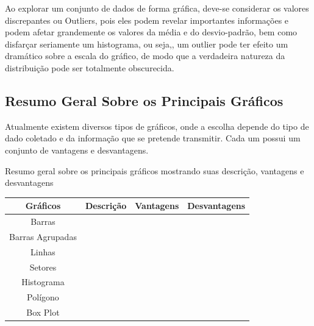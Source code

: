 \inic Ao explorar um conjunto de dados de forma gráfica, deve-se considerar os valores discrepantes ou Outliers, pois eles podem revelar importantes informações e podem afetar grandemente os valores da média e do desvio-padrão, bem como disfarçar seriamente um histograma, ou seja,, um outlier pode ter efeito um dramático sobre a escala do gráfico, de modo que a verdadeira natureza da distribuição pode ser totalmente  obscurecida.












\newpage


\subsection{Resumo Geral Sobre os Principais Gráficos}

\inic Atualmente existem diversos tipos de gráficos, onde a escolha depende do tipo de dado coletado e da informação que se pretende transmitir. Cada um possui um conjunto de vantagens e desvantagens.      

\begin{quadro}[h!tp]
    \centering
    \caption{Resumo geral sobre os principais gráficos mostrando suas descrição, vantagens e desvantagens}
    \begin{tabular}{|c|c|c|c|}
   \hline\hline
    Gráficos       & Descrição &  Vantagens & Desvantagens \\   
\hline\hline
  Barras           &           &           &             \\
  Barras Agrupadas &           &           &              \\
  Linhas           &           &           &              \\  
  Setores          &           &           &              \\
  Histograma       &           &           &              \\
  Polígono         &           &           &              \\
  Box Plot         &           &           &              \\
\hline\hline
\end{tabular}
\end{quadro}









